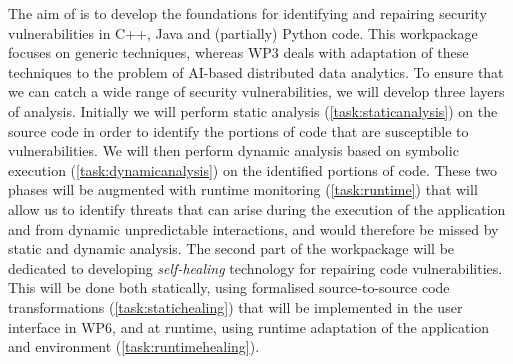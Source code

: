 \begin{Workpackage}{\thewpno}
\begin{WPDescription}
The aim of \theWP{} is to develop the foundations %
for identifying and repairing security vulnerabilities in C++, Java and (partially) Python code. This workpackage focuses on generic techniques, whereas WP3 deals with adaptation of these techniques to the problem of AI-based distributed data analytics. To ensure that we can catch a wide range of security vulnerabilities, we will develop three layers of analysis. Initially we will perform static analysis (\ref{task:staticanalysis}) on the source code in order to identify the portions of code that are susceptible to vulnerabilities. We will then perform dynamic analysis based on symbolic execution (\ref{task:dynamicanalysis}) on the identified portions of code. These two phases will be augmented with runtime monitoring (\ref{task:runtime}) that will allow us to identify threats that can arise during the execution of the application and from dynamic unpredictable interactions, and would therefore be missed by static and dynamic analysis. The second part of the workpackage will be dedicated to developing \emph{self-healing} technology for repairing code vulnerabilities. This will be done both statically, using formalised source-to-source code transformations ({\ref{task:statichealing}}) that will be implemented in the user interface in WP6, and at runtime, using runtime adaptation of the application and environment (\ref{task:runtimehealing}).
\end{WPDescription}


\end{Workpackage}
